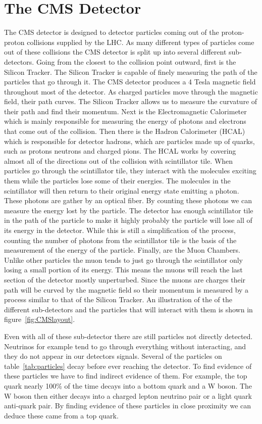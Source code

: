 \section{The CMS Detector}
The CMS detector is designed to detector particles coming out of the proton-proton collisions supplied by the LHC. As many different types of particles come out of these collisions the CMS detector is split up into several different sub-detectors. Going from the closest to the collision point outward, first is the Silicon Tracker. The Silicon Tracker is capable of finely measuring the path of the particles that go through it. The CMS detector produces a 4 Tesla magnetic field throughout most of the detector. As charged particles move through the magnetic field, their path curves. The Silicon Tracker allows us to measure the curvature of their path and find their momentum. Next is the Electromagnetic Calorimeter which is mainly responsible for measuring the energy of photons and electrons that come out of the collision. Then there is the Hadron Calorimeter (HCAL) which is responsible for detector hadrons, which are particles made up of quarks, such as protons neutrons and charged pions. The HCAL works by covering almost all of the directions out of the collision with scintillator tile. When particles go through the scintillator tile, they interact with the molecules exciting them while the particles lose some of their energies. The molecules in the scintillator will then return to their original energy state emitting a photon. These photons are gather by an optical fiber. By counting these photons we can measure the energy lost by the particle. The detector has enough scintillator tile in the path of the particle to make it highly probably the particle will lose all of its energy in the detector. While this is still a simplification of the process, counting the number of photons from the scintillator tile is the basis of the measurement of the energy of the particle. Finally, are the Muon Chambers. Unlike other particles the muon tends to just go through the scintillator only losing a small portion of its energy. This means the muons will reach the last section of the detector mostly unperturbed. Since the muons are charges their path will be curved by the magnetic field so their momentum is measured by a process similar to that of the Silicon Tracker. An illustration of the of the different sub-detectors and the particles that will interact with them is shown in figure~\ref{fig:CMSlayout}.

Even with all of these sub-detector there are still particles not directly detected. Neutrinos for example tend to go through everything without interacting, and they do not appear in our detectors signals. Several of the particles on table~\ref{tab:particles} decay before ever reaching the detector. To find evidence of these particles we have to find indirect evidence of them. For example, the top quark nearly 100\% of the time decays into a bottom quark and a W boson. The W boson then either decays into a charged lepton neutrino pair or a light quark anti-quark pair. By finding evidence of these particles in close proximity we can deduce these came from a top quark.

